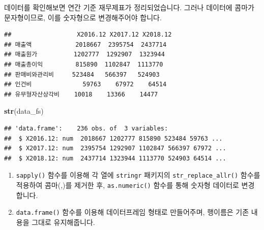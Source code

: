 \documentclass[]{book}
\newenvironment{Shaded}{\begin{snugshade}}{\end{snugshade}}
\newcommand{\ControlFlowTok}[1]{\textcolor[rgb]{0.13,0.29,0.53}{\textbf{#1}}}
\newcommand{\DataTypeTok}[1]{\textcolor[rgb]{0.13,0.29,0.53}{#1}}
\newcommand{\KeywordTok}[1]{\textcolor[rgb]{0.13,0.29,0.53}{\textbf{#1}}}
\newcommand{\NormalTok}[1]{#1}
\newcommand{\OperatorTok}[1]{\textcolor[rgb]{0.81,0.36,0.00}{\textbf{#1}}}
\newcommand{\StringTok}[1]{\textcolor[rgb]{0.31,0.60,0.02}{#1}}
\providecommand{\tightlist}{%
  \setlength{\itemsep}{0pt}\setlength{\parskip}{0pt}}
\begin{document}
데이터를 확인해보면 연간 기준 재무제표가 정리되었습니다. 그러나 데이터에 콤마가 문자형이므로, 이를 숫자형으로 변경해주어야 합니다.

\begin{Shaded}
\end{Shaded}

\begin{verbatim}
##                  X2016.12 X2017.12 X2018.12
## 매출액            2018667  2395754  2437714
## 매출원가          1202777  1292907  1323944
## 매출총이익         815890  1102847  1113770
## 판매비와관리비     523484   566397   524903
## 인건비              59763    67972    64514
## 유무형자산상각비    10018    13366    14477
\end{verbatim}

\begin{Shaded}
\begin{Highlighting}[]
\KeywordTok{str}\NormalTok{(data_fs)}
\end{Highlighting}
\end{Shaded}

\begin{verbatim}
## 'data.frame':    236 obs. of  3 variables:
##  $ X2016.12: num  2018667 1202777 815890 523484 59763 ...
##  $ X2017.12: num  2395754 1292907 1102847 566397 67972 ...
##  $ X2018.12: num  2437714 1323944 1113770 524903 64514 ...
\end{verbatim}

\begin{enumerate}
\def\labelenumi{\arabic{enumi}.}
\tightlist
\item
  \texttt{sapply()} 함수를 이용해 각 열에 \texttt{stringr} 패키지의 \texttt{str\_replace\_allr()} 함수를 적용하여 콤마(,)를 제거한 후, \texttt{as.numeric()} 함수를 통해 숫자형 데이터로 변경합니다.
\item
  \texttt{data.frame()} 함수를 이용해 데이터프레임 형태로 만들어주며, 행이름은 기존 내용을 그대로 유지해줍니다.
\end{enumerate}
\end{document}
